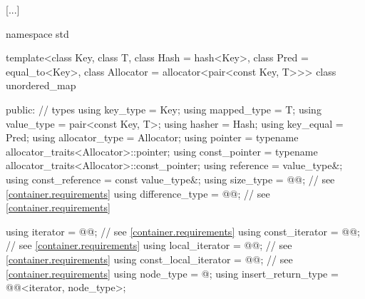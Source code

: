 \documentclass{wg21}
\begin{document}
[...]
%
\begin{codeblock}
namespace std {
    template<class Key,
    class T,
    class Hash = hash<Key>,
    class Pred = equal_to<Key>,
    class Allocator = allocator<pair<const Key, T>>>
    class unordered_map {
        public:
        // types
        using key_type             = Key;
        using mapped_type          = T;
        using value_type           = pair<const Key, T>;
        using hasher               = Hash;
        using key_equal            = Pred;
        using allocator_type       = Allocator;
        using pointer              = typename allocator_traits<Allocator>::pointer;
        using const_pointer        = typename allocator_traits<Allocator>::const_pointer;
        using reference            = value_type&;
        using const_reference      = const value_type&;
        using size_type            = @@; // see \ref{container.requirements}
        using difference_type      = @@; // see \ref{container.requirements}
        
        using iterator             = @@; // see \ref{container.requirements}
        using const_iterator       = @@; // see \ref{container.requirements}
        using local_iterator       = @@; // see \ref{container.requirements}
        using const_local_iterator = @@; // see \ref{container.requirements}
        using node_type            = @\unspec@;
        using insert_return_type   = @@<iterator, node_type>;
        
}}
\end{codeblock}
\end{document}
